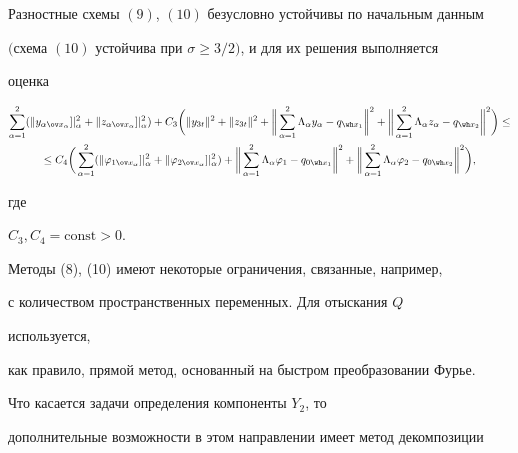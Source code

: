 \begin{thm}


Разностные схемы $(9)$, $(10)$ безусловно устойчивы по начальным данным


$($схема $(10)$ устойчива при $\sigma\geq 3/2)$, и для их решения выполняется


оценка


\begin{multline*}


\sum_{\alpha=1}^2(\|y_{\alpha\ov x_\alpha}]|_\alpha^2+


\|z_{\alpha\ov


x_\alpha}]|_\alpha^2)+C_3\bigg(\|y_{3t}\|^2+\|z_{3t}\|^2+


\bigg\|\sum_{\alpha=1}^2\Lambda_\alpha y_\alpha-q_{\wh


x_1}\bigg\|^2+


\bigg\|\sum_{\alpha=1}^2\Lambda_\alpha z_\alpha-q_{\wh


x_2}\bigg\|^2\bigg)\leq \\


\leq C_4\bigg(


\sum_{\alpha=1}^2(\|\varphi_{1\ov x_\alpha}]|_\alpha^2+


\|\varphi_{2\ov x_\alpha}]|_\alpha^2)+


\bigg\|\sum_{\alpha=1}^2\Lambda_\alpha\varphi_1-q_{0\wh


x_1}\bigg\|^2+


\bigg\|\sum_{\alpha=1}^2\Lambda_\alpha\varphi_2-q_{0\wh x_2}


\bigg\|^2\bigg),


\end{multline*}


где


$C_3,C_4=\mathrm{const}>0$.


\end{thm}





Методы (8), (10) имеют некоторые ограничения, связанные, например,


с количеством пространственных переменных. Для отыскания $Q$


используется,


как правило, прямой метод, основанный на быстром преобразовании Фурье.


Что касается задачи определения компоненты $Y_2$, то


дополнительные возможности в этом направлении имеет метод декомпозиции



